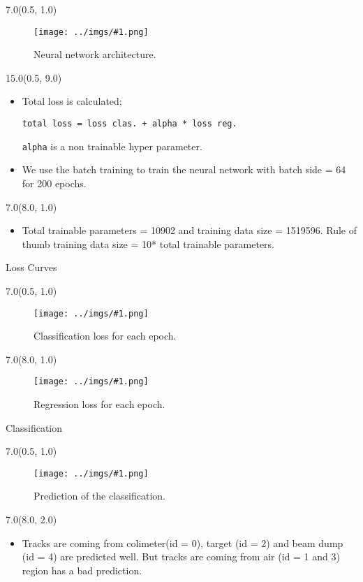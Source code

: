 \documentclass[12pt, xcolor={dvipsnames}, aspectratio = 169, sans,mathserif]{beamer}
\newcommand{\leftpic}[2]
{
\begin{textblock}{7.0}(0.5, 1.0)
\begin{figure}
    \centering
    \texttt{[image: ../imgs/\#1.png]}
    \caption{#2}
\end{figure}
\end{textblock}
}
\newcommand{\rightpic}[2]
{
\begin{textblock}{7.0}(8.0, 1.0)
\begin{figure}
    \centering
    \texttt{[image: ../imgs/\#1.png]}
    \caption{#2}
\end{figure}
\end{textblock}
}
\begin{document}
\begin{frame}[fragile]

\leftpic{dimuNet}{Neural network architecture.}

\begin{textblock}{15.0}(0.5, 9.0)

\begin{itemize}

	\item Total loss is calculated;

\begin{verbatim}
total loss = loss clas. + alpha * loss reg.
\end{verbatim}

\verb|alpha| is a non trainable hyper parameter.

	\item We use the batch training to train the neural network with batch side = 64 for 200 epochs.

\end{itemize}

\end{textblock}

\begin{textblock}{7.0}(8.0, 1.0)

\begin{itemize}

	\item Total trainable parameters = 10902 and training data size = 1519596. Rule of thumb training data size = 10* total trainable parameters.

\end{itemize}

\end{textblock}

\end{frame}

\begin{frame}{Loss Curves}

\leftpic{cls-loss}{Classification loss for each epoch.}

\rightpic{reg-loss}{Regression loss for each epoch.}

\end{frame}

\begin{frame}{Classification}

\leftpic{cls-hot-id}{Prediction of the classification.}

\begin{textblock}{7.0}(8.0, 2.0)

\begin{itemize}

	\item Tracks are coming from colimeter(id = 0), target (id = 2) and beam dump (id = 4) are predicted well. But tracks are coming from air (id = 1 and 3) region has a bad prediction.

\end{itemize}

\end{textblock}

\end{frame}
\end{document}
